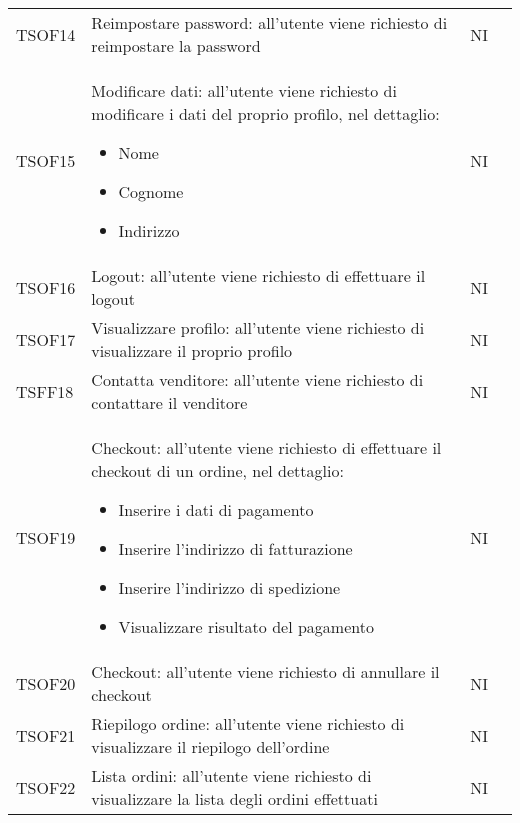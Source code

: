 \begin{center}
\begin{longtable}[!h]{p{50px} p{245px} p{75px} p{50px}}
TSOF14                           & Reimpostare password: all'utente viene richiesto di reimpostare la password                                                                      & NI             \\
TSOF15                           & Modificare dati: all'utente viene richiesto di modificare i dati del proprio profilo, nel dettaglio: \begin{itemize} \item Nome \item Cognome \item Indirizzo \end{itemize}                  & NI             \\
TSOF16                           & Logout: all'utente viene richiesto di effettuare il logout                                                                                       & NI             \\
TSOF17                           & Visualizzare profilo: all'utente viene richiesto di visualizzare il proprio profilo                                                              & NI             \\
TSFF18                           & Contatta venditore: all'utente viene richiesto di contattare il venditore                                                                        & NI             \\
TSOF19                           & Checkout: all'utente viene richiesto di effettuare il checkout di un ordine, nel dettaglio: \begin{itemize} \item Inserire i dati di pagamento \item Inserire l'indirizzo di fatturazione \item Inserire l'indirizzo di spedizione \item Visualizzare risultato del pagamento \end{itemize}                           & NI             \\
TSOF20                           & Checkout: all'utente viene richiesto di annullare il checkout                                                                                    & NI             \\
TSOF21                           & Riepilogo ordine: all'utente viene richiesto di visualizzare il riepilogo dell'ordine                                                            & NI             \\
TSOF22                           & Lista ordini: all'utente viene richiesto di visualizzare la lista degli ordini effettuati                                                        & NI             \\

\end{longtable}
\end{center}
